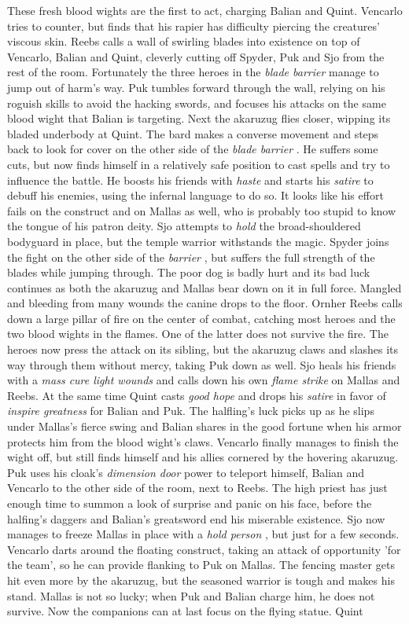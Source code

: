 These fresh blood wights are the first to act, charging Balian and Quint. Vencarlo tries to counter, but finds that his rapier has difficulty piercing the creatures' viscous skin. Reebs calls a wall of swirling blades into existence on top of Vencarlo, Balian and Quint, cleverly cutting off Spyder, Puk and Sjo from the rest of the room. Fortunately the three heroes in the {\itshape blade barrier} manage to jump out of harm's way. Puk tumbles forward through the wall, relying on his roguish skills to avoid the hacking swords, and focuses his attacks on the same blood wight that Balian is targeting. Next the akaruzug flies closer, wipping its bladed underbody at Quint. The bard makes a converse movement and steps back to look for cover on the other side of the  {\itshape blade barrier} . He suffers some cuts, but now finds himself in a relatively safe position to cast spells and try to influence the battle. He boosts his friends with  {\itshape haste} and starts his  {\itshape satire} to debuff his enemies, using the infernal language to do so. It looks like his effort fails on the construct and on Mallas as well, who is probably too stupid to know the tongue of his patron deity. Sjo attempts to  {\itshape hold} the broad-shouldered bodyguard in place, but the temple warrior withstands the magic. Spyder joins the fight on the other side of the  {\itshape barrier} , but suffers the full strength of the blades while jumping through. The poor dog is badly hurt and its bad luck continues as both the akaruzug and Mallas bear down on it in full force. Mangled and bleeding from many wounds the canine drops to the floor. Ornher Reebs calls down a large pillar of fire on the center of combat, catching most heroes and the two blood wights in the flames. One of the latter does not survive the fire. The heroes now press the attack on its sibling, but the akaruzug claws and slashes its way through them without mercy, taking Puk down as well. Sjo heals his friends with a  {\itshape mass cure light wounds} and calls down his own  {\itshape flame strike} on Mallas and Reebs. At the same time Quint casts  {\itshape good hope} and drops his  {\itshape satire} in favor of  {\itshape inspire greatness} for Balian and Puk. The halfling's luck picks up as he slips under Mallas's fierce swing and Balian shares in the good fortune when his armor protects him from the blood wight's claws. Vencarlo finally manages to finish the wight off, but still finds himself and his allies cornered by the hovering akaruzug. Puk uses his cloak's  {\itshape dimension door} power to teleport himself, Balian and Vencarlo to the other side of the room, next to Reebs. The high priest has just enough time to summon a look of surprise and panic on his face, before the halfing's daggers and Balian's greatsword end his miserable existence. Sjo now manages to freeze Mallas in place with a  {\itshape hold person} , but just for a few seconds. Vencarlo darts around the floating construct, taking an attack of opportunity 'for the team', so he can provide flanking to Puk on Mallas. The fencing master gets hit even more by the akaruzug, but the seasoned warrior is tough and makes his stand. Mallas is not so lucky; when Puk and Balian charge him, he does not survive. Now the companions can at last focus on the flying statue. Quint 